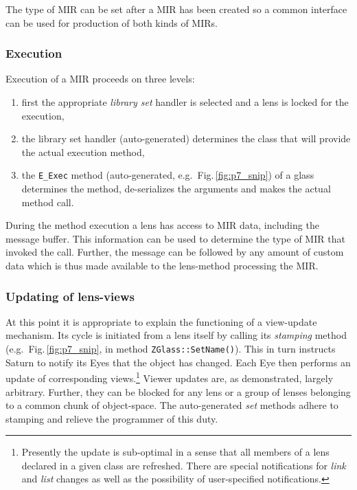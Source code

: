 \documentclass[final]{siamltex}
\def\smalltt#1{{\small\texttt{#1}}}
\begin{document}
The type of MIR can be set after a MIR has been created so a common
interface can be used for production of both kinds of MIRs.


\subsubsection{Execution}

Execution of a MIR proceeds on three levels:
\begin{enumerate}
\item first the appropriate \emph{library set} handler is selected and
  a lens is locked for the execution,
\item the library set handler (auto-generated) determines the class
  that will provide the actual execution method,
\item the \smalltt{E\_Exec} method (auto-generated, e.g.\ 
  Fig.\,\ref{fig:p7_snip}) of a glass determines the method,
  de-serializes the arguments and makes the actual method call.
\end{enumerate}
During the method execution a lens has access to MIR data, including
the message buffer. This information can be used to determine the type
of MIR that invoked the call. Further, the message can be followed by
any amount of custom data which is thus made available to the
lens-method processing the MIR.

\subsubsection{Updating of lens-views}
\label{ssec:DM_Stamping}

At this point it is appropriate to explain the functioning of a
view-update mechanism. Its cycle is initiated from a lens itself by
calling its \emph{stamping} method (e.g.\ Fig.\,\ref{fig:p7_snip}, in
method \smalltt{ZGlass::SetName()}). This in turn instructs Saturn to
notify its Eyes that the object has changed. Each Eye then performs an
update of corresponding views.\footnote{%
  Presently the update is sub-optimal in a sense that all members of a
  lens declared in a given class are refreshed. There are special
  notifications for \emph{link} and \emph{list} changes as well as the
  possibility of user-specified
  notifications.} %
Viewer updates are, as demonstrated, largely arbitrary. Further, they
can be blocked for any lens or a group of lenses belonging to a common
chunk of object-space. The auto-generated \emph{set} methods adhere to
stamping and relieve the programmer of this duty.
\end{document}
